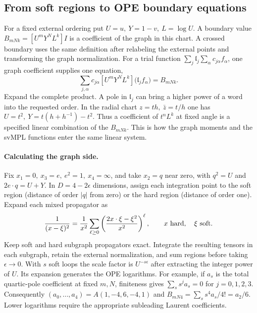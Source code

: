 \subsection{From soft regions to OPE boundary equations}\label{app:boundarymoments}
For a fixed external ordering put \(U=u,\ Y=1-v,\ L=\log U\). A boundary value
\(B_{mNk}=[U^mY^NL^k]I\) is a coefficient of the graph in this chart.
A crossed boundary uses the same definition after relabeling the external
points and transforming the graph normalization. For a trial function
\(\sum_j \mathfrak{l}_j\sum_\alpha c_{j\alpha} f_\alpha\), one graph coefficient supplies one equation,
\[
 \sum_{j,\alpha}c_{j\alpha}[U^mY^NL^k]\bigl(\mathfrak{l}_j f_\alpha\bigr)=B_{mNk}.
\]
Expand the complete product. A pole in \(\mathfrak{l}_j\) can bring a higher power of a
word into the requested order. In the radial chart \(z=th,\ \bar z=t/h\) one
has \(U=t^2,\ Y=t(h+h^{-1})-t^2\). Thus a coefficient of \(t^nL^k\) at
fixed angle is a specified linear combination of the \(B_{mNk}\). This is how
the graph moments and the svMPL functions enter the same linear system.

\paragraph{Calculating the graph side.}
Fix \(x_1=0,\ x_3=e,\ e^2=1,\ x_4=\infty\), and take \(x_2=q\) near zero,
with \(q^2=U\) and \(2e\cdot q=U+Y\). In \(D=4-2\epsilon\) dimensions, assign
each integration point to the soft region (distance of order \(|q|\) from
zero) or the hard region (distance of order one). Expand each mixed propagator
as
\[
 \frac1{(x-\xi)^2}=\frac1{x^2}
 \sum_{\ell\ge0}\left(\frac{2x\cdot\xi-\xi^2}{x^2}\right)^\ell ,
 \qquad x\ {\rm hard},\quad \xi\ {\rm soft}.
\]
Keep soft and hard subgraph propagators exact. Integrate the resulting tensors in
each subgraph, retain the external normalization, and sum regions before taking
\(\epsilon\to0\). With \(s\) soft loops the scale factor is \(U^{-s\epsilon}\)
after extracting the integer power of \(U\). Its expansion generates the OPE
logarithms. For example, if \(a_s\) is the total quartic-pole coefficient at
fixed \(m,N\), finiteness gives \(\sum_s s^j a_s=0\) for \(j=0,1,2,3\).
Consequently \((a_0,\ldots,a_4)=A(1,-4,6,-4,1)\) and
\(B_{mN4}=\sum_s s^4a_s/4!=a_2/6\). Lower logarithms require the appropriate
subleading Laurent coefficients.

